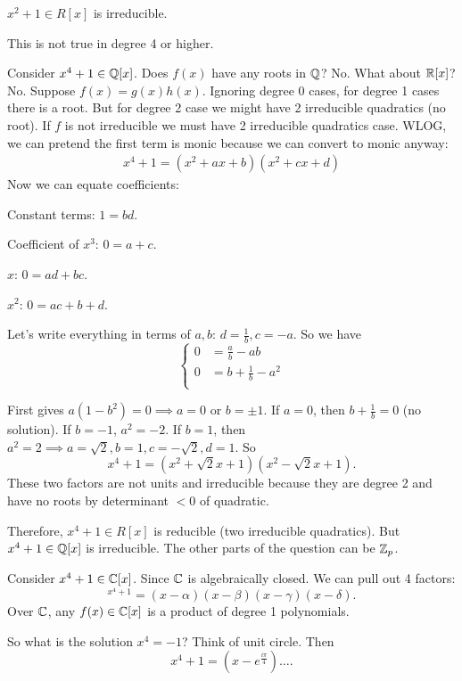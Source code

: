 \documentclass[class=article,crop=false]{standalone}
\begin{document}
\begin{eg}[]
	$ x^2 + 1 \in R[x]$ is irreducible.
\end{eg}
\begin{note}[]
This is not true in degree 4 or higher.
\end{note}
\begin{eg}
	Consider $ x^{4}+1 \in \mathbb{Q}[x]$. Does $ f(x)$ have any roots in  $ \mathbb{Q}$? No. What about $ \mathbb{R}[x]$? No. Suppose $ f(x) = g(x)h(x)$. Ignoring degree 0 cases, for degree 1 cases there is a root. But for degree 2 case we might have 2 irreducible quadratics (no root). If  $ f$ is not irreducible we must have 2 irreducible quadratics case. WLOG, we can pretend the first term is monic because we can convert to monic anyway:
	 \begin{align*}
		 x^{4}+1 = (x^2+ ax + b)(x^2+cx+d) 
	\end{align*}
Now we can equate coefficients:

Constant terms: $ 1=bd$.

Coefficient of  $ x^3$: $ 0 = a+c$.

 $ x$: $ 0= ad+bc$.

  $ x^2$: $ 0 = ac+b+d$. 

  Let's write everything in terms of  $ a,b$:  $ d=\frac{1}{b}, c=-a$. So we have
  \begin{equation*}
  \begin{cases}
	  0&=\frac{a}{b} - ab\\
	  0&=b+\frac{1}{b} -a^2\\
  \end{cases}
  \end{equation*}

  First gives $ a(1-b^2)=0 \implies a=0 \text{ or }  b=\pm 1$. If $ a=0$, then  $ b+\frac{1}{b}=0$ (no solution). If $ b=-1$,  $ a^2 = -2$. If $ b=1$, then  $ a^2=2 \implies a=\sqrt{2}, b =1, c= -\sqrt{2}, d=1  $. So
  \[
	  x^{4}+1 = (x^2 + \sqrt{2}x+1 )(x^2 -\sqrt{2}x +1 )
  .\]
  These two factors are not units and irreducible because they are degree 2 and have no roots by determinant $ <0$ of quadratic. 

  Therefore, $ x^{4}+1 \in R[x]$ is reducible (two irreducible quadratics). But $ x^{4}+1 \in \mathbb{Q}[x]$ is irreducible. The other parts of the question can be $ \mathbb{Z}_p$. 

  Consider $ x^{4}+1 \in \mathbb{C}[x]$. Since $ \mathbb{C}$ is algebraically closed. We can pull out 4 factors:
  \[
	  ^{x^{4}+1} = (x-\alpha)(x-\beta)(x-\gamma)(x-\delta)
  .\] 
  Over $ \mathbb{C}$, any $ f(x) \in  \mathbb{C}[x]$ is a product of degree 1 polynomials. 

  So what is the solution $ x^{4}=-1 $? Think of unit circle. Then
  \[
	  x^{4}+1 = (x-e^{\frac{i\pi}{4 }})\ldots
  .\] 
\end{eg}
\end{document}
